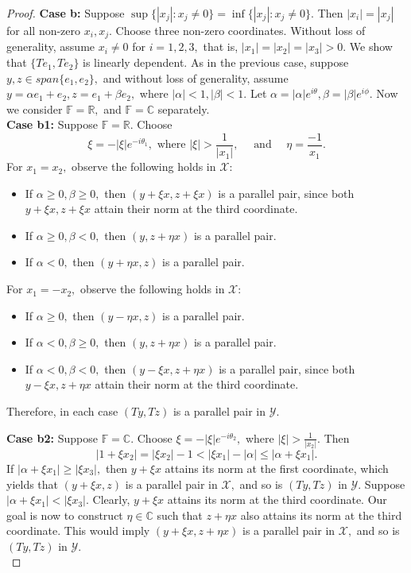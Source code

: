 \documentclass{amsart}
\theoremstyle{definition}
\theoremstyle{remark}
\numberwithin{equation}{section}
\begin{document}
\begin{proof}
\textbf{Case b:} Suppose $\sup\{|x_j|:x_j\neq 0\}= \inf\{|x_j|:x_j\neq 0\}.$   Then $|x_i|=|x_j|$ for all non-zero $x_i,x_j.$ Choose three non-zero coordinates. Without loss of generality, assume $x_i\neq 0$ for $i=1,2,3,$ that is, $|x_1|=|x_2|=|x_3|>0.$ We show that $\{Te_1,Te_2\}$ is linearly dependent. As in the previous case, suppose $y,z\in span\{e_1,e_2\},$ and  without loss of generality, assume $y=\alpha e_1+e_2, z=e_1+\beta e_2,$ where  $|\alpha|<1,|\beta|<1.$ Let $\alpha=|\alpha|e^{i\theta},\beta=|\beta|e^{i\phi}.$ Now we consider $\mathbb{F}=\mathbb{R},$ and $\mathbb{F}=\mathbb{C}$ separately. \\
\textbf{Case b1:} 
Suppose $\mathbb{F}=\mathbb{R}.$  Choose $$\xi=-|\xi|e^{-i\theta_1}, \text{ where }|\xi|>\frac{1}{|x_1|},\quad \text{ and }\quad  \eta =\frac{-1}{x_1}.$$ For $x_1=x_2,$ observe the following holds in $\mathcal{X}$:
\begin{itemize}
\item If $\alpha\geq 0,\beta\geq 0,$ then	$(y+\xi x,z+\xi x)$ is a parallel pair, since both $y+\xi x,z+\xi x$ attain their norm at the third coordinate.
\item If $\alpha\geq 0,\beta< 0,$ then $(y,z+\eta x)$ is a parallel pair.%
\item If $\alpha<0,$ then $(y+\eta  x,z)$ is a parallel pair.%
\end{itemize}
For $x_1=-x_2,$  observe the following holds in $\mathcal{X}$:
\begin{itemize}
	\item If $\alpha\geq 0,$ then	$(y-\eta x,z)$ is a parallel pair.%
	\item If $\alpha< 0,\beta\geq  0,$ then $(y,z+\eta x)$ is a parallel pair.%
	\item If $\alpha<0,\beta<0,$ then $(y-\xi x,z+\eta x)$ is a parallel pair,  since both $y-\xi x,z+\eta x$ attain their norm at the third coordinate.
\end{itemize}
Therefore, in each case $(Ty,Tz)$ is a parallel pair in $\mathcal{Y}.$
 

\noindent \textbf{Case b2:} 
Suppose $\mathbb{F}=\mathbb{C}.$
Choose $\xi=-|\xi|e^{-i\theta_2},$ where $|\xi|>\frac{1}{|x_2|}.$ Then 
\[|1+\xi x_2|=|\xi x_2|-1<|\xi x_1|-|\alpha|\leq |\alpha+\xi x_1|.\]
If $|\alpha+\xi x_1|\geq |\xi x_3|,$ then  $y+\xi x$ attains its norm at the first coordinate, which yields that $(y+\xi x,z)$ is a parallel pair in $\mathcal{X},$ and so is $(Ty,Tz)$ in $\mathcal{Y}.$ Suppose $|\alpha+\xi x_1|< |\xi x_3|.$  Clearly,  $y+\xi x$ attains its norm at the third coordinate. Our goal is now to  construct $\eta\in \mathbb{C}$ such that $z+\eta x$ also attains its norm at the third coordinate. This would imply $(y+\xi x,z+\eta x)$ is a parallel pair in $\mathcal{X},$ and so is $(Ty,Tz)$ in $\mathcal{Y}.$\\


\end{proof}
\end{document}
